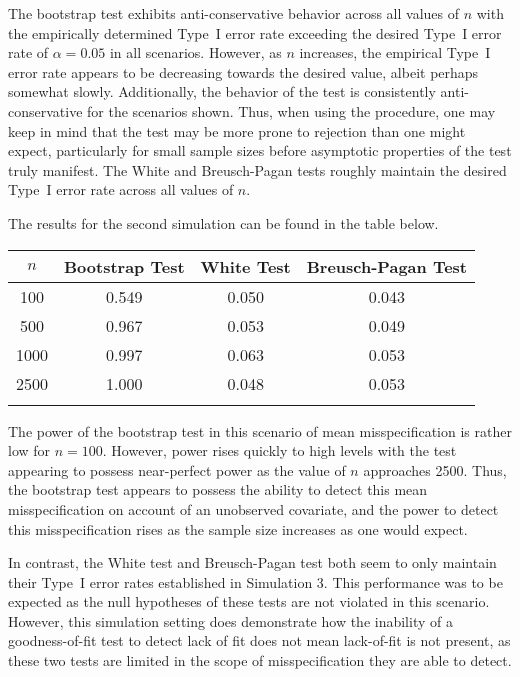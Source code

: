 \documentclass[12pt]{article} %
\theoremstyle{definition}
\begin{document}
The bootstrap test exhibits anti-conservative behavior across all values of $n$ with the empirically determined Type~I error rate exceeding the desired Type~I error rate
of $\alpha = 0.05$ in all scenarios. However, as $n$ increases, the empirical Type~I error rate appears to be decreasing towards the desired value, albeit perhaps somewhat slowly. Additionally, the
behavior of the test is consistently anti-conservative for the scenarios shown. Thus, when using the procedure, one may keep in mind that the test may be more prone to
rejection than one might expect, particularly for small sample sizes before asymptotic properties of the test truly manifest. The White and Breusch-Pagan tests roughly maintain
the desired Type~I error rate across all values of $n$.

The results for the second simulation can be found in the table below.

\begin{table}[H]
	\centering
	\small\addtolength{\tabcolsep}{-3pt}
	\setlength\extrarowheight{-3pt}
	{
	\begin{tabular}{ c|c|c|c}
	$n$ & Bootstrap Test & White Test & Breusch-Pagan Test \\
	 \hline
	 100 & 0.549 & 0.050 & 0.043 \\
	 500 & 0.967 & 0.053 & 0.049 \\
	 1000 & 0.997 & 0.063 & 0.053 \\
	 2500 & 1.000 & 0.048 & 0.053 \\
	 \Xhline{3\arrayrulewidth}
	\end{tabular}
	}
\end{table}

The power of the bootstrap test in this scenario of mean misspecification is rather low for $n = 100$. However, power rises quickly to high levels
with the test appearing to possess near-perfect power as the value of $n$ approaches 2500. Thus, the bootstrap test appears to possess the ability to detect this mean
misspecification on account of an unobserved covariate, and the power to detect this misspecification rises as the sample size increases as one would expect.

In contrast, the White test and Breusch-Pagan test both seem to only maintain their Type~I error rates established in Simulation 3. This performance was to be expected
as the null hypotheses of these tests are not violated in this scenario. However, this simulation setting does demonstrate how the inability of a goodness-of-fit test to detect lack of
fit does not mean lack-of-fit is not present, as these two tests are limited in the scope of misspecification they are able to detect.
\end{document}
